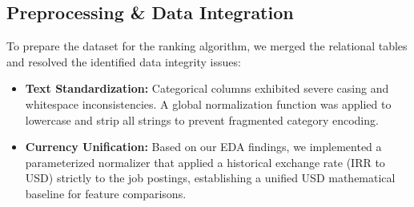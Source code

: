 \documentclass[a4paper,12pt]{extarticle}
\begin{document}
\subsection{Preprocessing \& Data Integration}
To prepare the dataset for the ranking algorithm, we merged the relational tables and resolved the identified data integrity issues:
\begin{itemize}
    \item \textbf{Text Standardization:} Categorical columns exhibited severe casing and whitespace inconsistencies. A global normalization function was applied to lowercase and strip all strings to prevent fragmented category encoding.
    \item \textbf{Currency Unification:} Based on our EDA findings, we implemented a parameterized normalizer that applied a historical exchange rate (IRR to USD) strictly to the job postings, establishing a unified USD mathematical baseline for feature comparisons.
\end{itemize}
\end{document}
